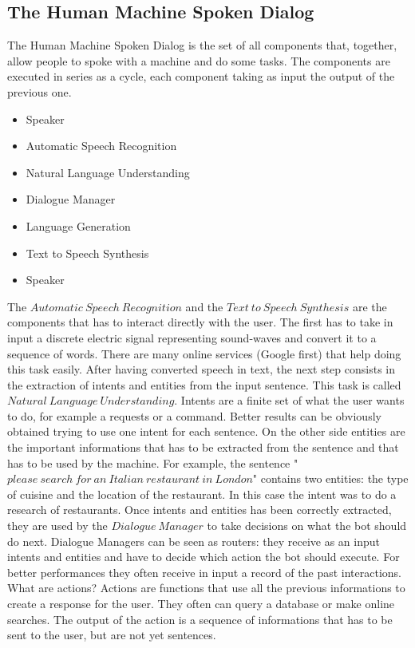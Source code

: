 \documentclass[11pt,a4paper]{article}
\begin{document}
\subsection{The Human Machine Spoken Dialog}

The Human Machine Spoken Dialog is the set of all components that, together, allow people to spoke with a machine and do some tasks. The components are executed in series as a cycle, each component taking as input the output of the previous one.
\begin{itemize}
\item Speaker
\item Automatic Speech Recognition
\item Natural Language Understanding
\item Dialogue Manager
\item Language Generation
\item Text to Speech Synthesis
\item Speaker
\end{itemize}
The $Automatic\ Speech\ Recognition$ and the $Text\ to\ Speech\ Synthesis$ are the components that has to interact directly with the user. The first has to take in input a discrete electric signal representing sound-waves and convert it to a sequence of words. There are many online services (Google first) that help doing this task easily.
After having converted speech in text, the next step consists in the extraction of intents and entities from the input sentence. This task is called $Natural\ Language\ Understanding$. Intents are a finite set of what the user wants to do, for example a requests or a command. Better results can be obviously obtained trying to use one intent for each sentence. On the other side entities are the important informations that has to be extracted from the sentence and that has to be used by the machine. For example, the sentence "$please\ search\ for\ an\ Italian\ restaurant\ in\ London$" contains two entities: the type of cuisine and the location of the restaurant. In this case the intent was to do a research of restaurants.
Once intents and entities has been correctly extracted, they are used by the $Dialogue\ Manager$ to take decisions on what the bot should do next. Dialogue Managers can be seen as routers: they receive as an input intents and entities and have to decide which action the bot should execute. For better performances they often receive in input a record of the past interactions. What are actions? Actions are functions that use all the previous informations to create a response for the user. They often can query a database or make online searches. The output of the action is a sequence of informations that has to be sent to the user, but are not yet sentences.
\end{document}
